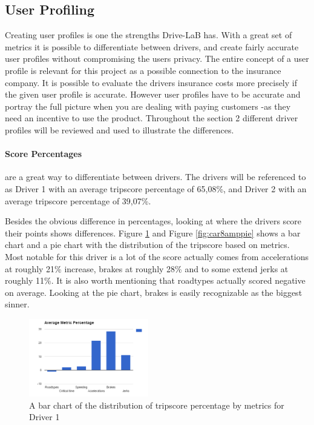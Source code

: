 \subsection{User Profiling}\label{subsec:userprofiling}

Creating user profiles is one the strengths Drive-LaB has. With a great set of metrics it is possible to differentiate between drivers, and create fairly accurate user profiles without compromising the users privacy. The entire concept of a user profile is relevant for this project as a possible connection to the insurance company. It is possible to evaluate the drivers insurance costs more precisely if the given user profile is accurate. However user profiles have to be accurate and portray the full picture when you are dealing with paying customers\citep{art:insurtelematics} -as they need an incentive to use the product. Throughout the section 2 different driver profiles will be reviewed and used to illustrate the differences. 

\paragraph{Score Percentages} are a great way to differentiate between drivers. The drivers will be referenced to as Driver 1 with an average tripscore percentage of 65,08\%, and Driver 2 with an average tripscore percentage of 39,07\%.

Besides the obvious difference in percentages, looking at where the drivers score their points shows differences. Figure \ref{fig:car8ampbar} and Figure \ref{fig:car8amppie} shows a bar chart and a pie chart with the distribution of the tripscore based on metrics. Most notable for this driver is a lot of the score actually comes from accelerations at roughly 21\% increase, brakes at roughly 28\% and to some extend jerks at roughly 11\%. It is also worth mentioning that roadtypes actually scored negative on average. Looking at the pie chart, brakes is easily recognizable as the biggest sinner.

\begin{figure}[tb]
\centering
\includegraphics[width=0.465\textwidth]{Pictures/car8ampbar}
\caption{A bar chart of the distribution of tripscore percentage by metrics for Driver 1}
\label{fig:car8ampbar}
\end{figure}

